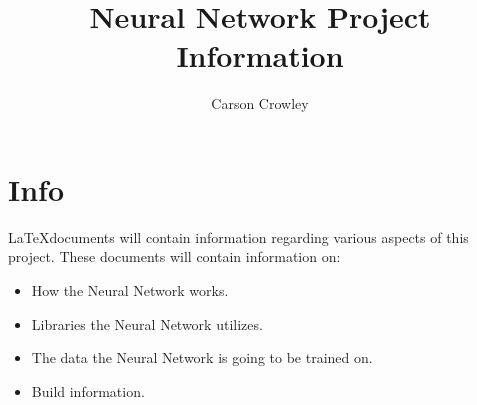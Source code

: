 \documentclass{article}
\title{Neural Network Project Information}
\author{Carson Crowley}
\begin{document}
 
\maketitle

\section*{Info}
\LaTeX documents will contain information regarding various aspects of this project. These documents will contain information on: 
\begin{itemize}
	\item How the Neural Network works. 
	\item Libraries the Neural Network utilizes. 
	\item The data the Neural Network is going to be trained on. 
	\item Build information. 
\end{itemize} 
\end{document}
